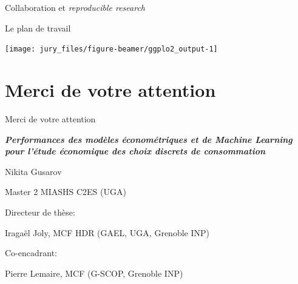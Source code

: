 \documentclass[11pt,ignorenonframetext,]{beamer}
\begin{document}
\begin{frame}{Collaboration et \emph{reproducible research}}
\begin{figure}
\end{figure}

\end{frame}

\begin{frame}{Le plan de travail}
\protect\hypertarget{le-plan-de-travail}{}

\hspace{-5cm}

\begin{center}\texttt{[image: jury\_files/figure-beamer/ggplo2\_output-1]} \end{center}

\end{frame}

\hypertarget{merci-de-votre-attention}{%
\section{Merci de votre attention}\label{merci-de-votre-attention}}

\begin{frame}{Merci de votre attention}
\protect\hypertarget{merci-de-votre-attention-1}{}

\begin{center}
\textbf{\textit{Performances des modèles économétriques et de Machine Learning pour l'étude économique des choix discrets de consommation}}

Nikita Gusarov

\small Master 2
MIASHS C2ES (UGA)
\end{center}

\raggedright\small Directeur de thèse:

\raggedright\hspace{10mm}\small Iragaël Joly, MCF HDR (GAEL, UGA,
Grenoble INP)

\raggedright\small Co-encadrant:

\raggedright\hspace{10mm}\small Pierre Lemaire, MCF (G-SCOP, Grenoble
INP)

\end{frame}
\end{document}
